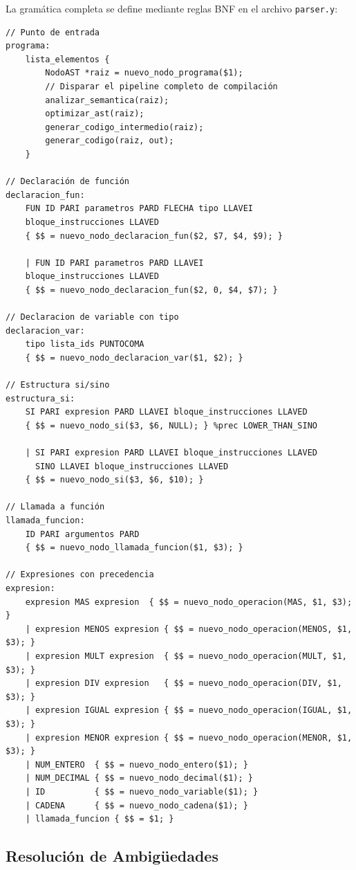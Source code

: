 La gramática completa se define mediante reglas BNF en el archivo \texttt{parser.y}:

\begin{lstlisting}[style=cstyle, caption={Reglas gramaticales principales}]
// Punto de entrada
programa:
    lista_elementos { 
        NodoAST *raiz = nuevo_nodo_programa($1);
        // Disparar el pipeline completo de compilación
        analizar_semantica(raiz);
        optimizar_ast(raiz);
        generar_codigo_intermedio(raiz);
        generar_codigo(raiz, out);
    }

// Declaración de función
declaracion_fun:
    FUN ID PARI parametros PARD FLECHA tipo LLAVEI 
    bloque_instrucciones LLAVED
    { $$ = nuevo_nodo_declaracion_fun($2, $7, $4, $9); }
    
    | FUN ID PARI parametros PARD LLAVEI 
    bloque_instrucciones LLAVED
    { $$ = nuevo_nodo_declaracion_fun($2, 0, $4, $7); }

// Declaracion de variable con tipo
declaracion_var:
    tipo lista_ids PUNTOCOMA
    { $$ = nuevo_nodo_declaracion_var($1, $2); }

// Estructura si/sino
estructura_si:
    SI PARI expresion PARD LLAVEI bloque_instrucciones LLAVED
    { $$ = nuevo_nodo_si($3, $6, NULL); } %prec LOWER_THAN_SINO
    
    | SI PARI expresion PARD LLAVEI bloque_instrucciones LLAVED
      SINO LLAVEI bloque_instrucciones LLAVED
    { $$ = nuevo_nodo_si($3, $6, $10); }

// Llamada a función
llamada_funcion:
    ID PARI argumentos PARD 
    { $$ = nuevo_nodo_llamada_funcion($1, $3); }

// Expresiones con precedencia
expresion:
    expresion MAS expresion  { $$ = nuevo_nodo_operacion(MAS, $1, $3); }
    | expresion MENOS expresion { $$ = nuevo_nodo_operacion(MENOS, $1, $3); }
    | expresion MULT expresion  { $$ = nuevo_nodo_operacion(MULT, $1, $3); }
    | expresion DIV expresion   { $$ = nuevo_nodo_operacion(DIV, $1, $3); }
    | expresion IGUAL expresion { $$ = nuevo_nodo_operacion(IGUAL, $1, $3); }
    | expresion MENOR expresion { $$ = nuevo_nodo_operacion(MENOR, $1, $3); }
    | NUM_ENTERO  { $$ = nuevo_nodo_entero($1); }
    | NUM_DECIMAL { $$ = nuevo_nodo_decimal($1); }
    | ID          { $$ = nuevo_nodo_variable($1); }
    | CADENA      { $$ = nuevo_nodo_cadena($1); }
    | llamada_funcion { $$ = $1; }
\end{lstlisting}

\subsection{Resolución de Ambigüedades}

